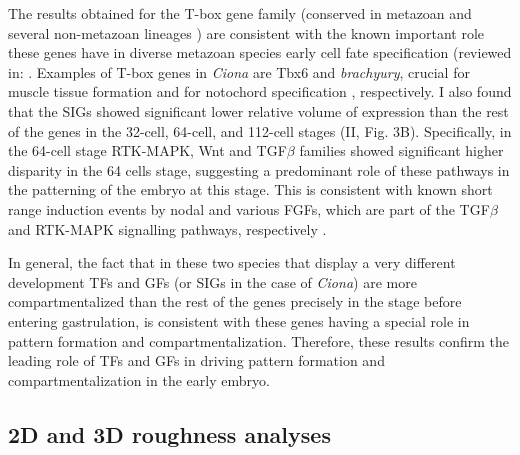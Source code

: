 The results obtained for the T-box gene family (conserved in metazoan and several non-metazoan lineages \citep{Sebe-Pedros2013}) are consistent with the known important role these genes have in diverse metazoan species early cell fate specification (reviewed in: \citealp{Papaioannou2014,Showell2004}.
Examples of T-box genes in \textit{Ciona} are Tbx6 and \textit{brachyury}, crucial for muscle tissue formation \citep{Mitani1999,Nishida2005} and for notochord specification \citep{Yasuo1998}, respectively.
I also found that the SIGs showed significant lower relative volume of expression than the rest of the genes in the 32-cell, 64-cell, and 112-cell stages (II, Fig. 3B).
Specifically, in the 64-cell stage RTK-MAPK, Wnt and TGF$\beta$ families showed significant higher disparity in the 64 cells stage, suggesting a predominant role of these pathways in the patterning of the embryo at this stage. 
This is consistent with known short range induction events by nodal and various FGFs, which are part of the TGF$\beta$ and RTK-MAPK signalling pathways, respectively \citep{Lemaire2008}.


In general, the fact that in these two species that display a very different development TFs and GFs (or SIGs in the case of \textit{Ciona}) are more compartmentalized than the rest of the genes precisely in the stage before entering gastrulation, is consistent with these genes having a special role in pattern formation and compartmentalization.
Therefore, these results confirm the leading role of TFs and GFs in driving pattern formation and compartmentalization in the early embryo.

\subsection{2D and 3D roughness analyses}


